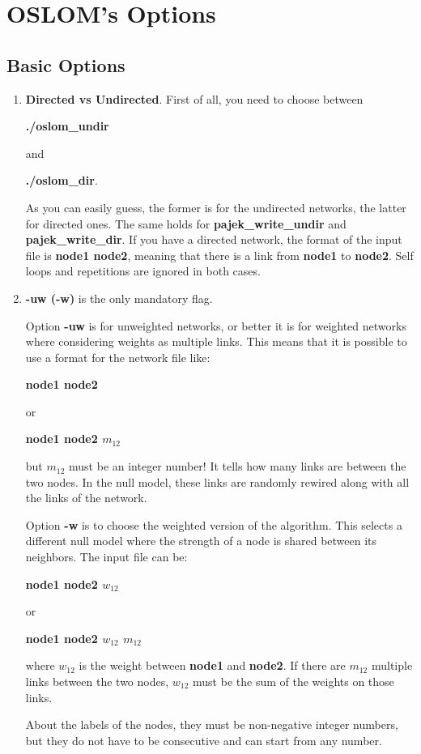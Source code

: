 \documentclass[11pt]{article}
\begin{document}
\section{OSLOM's Options}


  \subsection{Basic Options}
\label{basic_op}


\begin{enumerate}
  \item \textbf{Directed vs Undirected}. First of all, you need to choose between 
  
  \textbf{./oslom\_undir} 
  
  and  
  
  \textbf{./oslom\_dir}. 
  
  As you can easily guess, the former is for the undirected networks,
  the latter for directed ones. 
The same holds for \textbf{pajek\_write\_undir} and  \textbf{pajek\_write\_dir}.
If you have a directed network, the format of the input file is
\textbf{node1 node2}, meaning that there is a link from 
\textbf{node1} to  \textbf{node2}.  Self loops and repetitions are ignored in both cases.

  \item \textbf{-uw (-w)} is the only mandatory flag. 
  
  Option \textbf{-uw} is for unweighted networks, or better it is for
  weighted networks where considering weights as multiple links. 
This means that it is possible to use a format for the network file like: 
  
  \textbf{node1 node2} 
  
  or 
  
  \textbf{node1 node2 $m_{12}$}
  
  
  but $m_{12}$ must be an integer number! It tells how many links are
  between the two nodes. In the null model, 
these links are randomly rewired along with all the links of the network.
  
  Option \textbf{-w} is to choose the weighted version of the
  algorithm. 
This selects a different null model where the strength of a node is shared between its neighbors. The input file can be: 
  
   \textbf{node1 node2 $w_{12}$} 
  
  or 
  
  \textbf{node1 node2 $w_{12}$ $m_{12}$}

  where $w_{12}$ is the weight between \textbf{node1} and
  \textbf{node2}. If there are $m_{12}$ multiple links between the two
  nodes, $w_{12}$ must be the sum of the weights on those links.  
  
  About the labels of the nodes, they must be non-negative integer
  numbers, but they do not have to be consecutive and can start from any number.
  
  

\end{enumerate}
\end{document}
